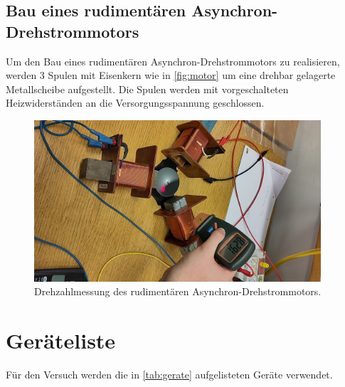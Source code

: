 \documentclass[12pt,english,ngerman]{scrartcl}
\begin{document}
\subsection{Bau eines rudimentären Asynchron-Drehstrommotors}

Um den Bau eines rudimentären Asynchron-Drehstrommotors zu realisieren, werden
3 Spulen mit Eisenkern wie in \autoref{fig:motor} um eine drehbar gelagerte
Metallscheibe aufgestellt. Die Spulen werden mit vorgeschalteten
Heizwiderständen an die Versorgungsspannung geschlossen.

\begin{figure}[H]
	\begin{center}
		\includegraphics[width = 0.95\textwidth]{figures/motor.jpg}
	\end{center}
	\caption[Drehzahlmessung des rudimentären Asynchron-Drehstrommotors]{ Drehzahlmessung
		des rudimentären Asynchron-Drehstrommotors.
	}\label{fig:motor}
\end{figure}

\section{Geräteliste}\label{sec:geraeteliste}

Für den Versuch werden die in \autoref{tab:gerate} aufgelisteten Geräte
verwendet.
\end{document}
